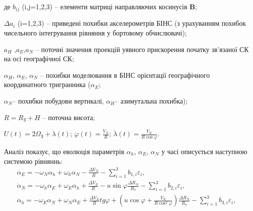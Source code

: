 \begin{ESKDexplanation}
\item де $b_{ij}$ (i,j=1,2,3) -- елементи матриці направляючих косинусів \textbf{B}; 
\item $\Delta a_{i}$ (i=1,2,3) -- приведені похибки акселерометрів БІНС (з урахуванням 
похибок чисельного інтегрування рівняння  у бортовому обчислювачі); 
\item $a_{H}$ ,$a_{E}$,$a_{N}$ -- поточні значення проекцій уявного прискорення початку зв'язаної СК на 
осі географічної СК; 
\item $\alpha_{H}$, $\alpha_{E}$, $\alpha_{N}$ -- похибки моделювання 
в БІНС орієнтації географічного координатного тригранника ($\alpha_{E} $;
\item $\alpha_{N} $-- похибки побудови вертикалі, $\alpha_{H} $-- азимутальна похибка); 
\item $R=R_{\text{З}} +H$ -- поточна висота; 
\item $U(t)=2\Omega_{\text{З}} +\dot{\lambda }(t)$; $\dot{\varphi}(t)=\frac{V_{N}}{R}$; $\dot{\lambda }(t)=\frac{V_{E}}{R\cos \varphi }.$ 
\end{ESKDexplanation}
  Аналіз показує, що еволюція параметрів $\alpha_{h}$, $\alpha_{E}$, $\alpha_{N}$ у часі описується наступною системою рівняннь:
\begin{equation} 
\label{eq:dasdins} \begin{array}{l} 
{\dot{\alpha }_{E} =-\omega_{N} \alpha_{h} +\omega_{h} \alpha_{N} -\frac{\Delta V_{N} }{R} -\sum_{i=1}^{3}b_{1,i}\varepsilon_{i} ,} \\
{\dot{\alpha }_{N} =-\omega_{h} \alpha_{E} +\omega_{E} \alpha_{h} +\frac{\Delta V_{E} }{R} -u\sin \varphi \frac{\Delta R_{N} }{R_{7} }
-\sum_{i=1}^{3}b_{2,i}  \varepsilon_{i} ,} \\ 
{\dot{\alpha }_{h} =-\omega_{E} \alpha_{N} +\omega_{N} \alpha_{E} +\frac{\Delta V_{E} }{R} tg\varphi +(u\cos \varphi +\frac{V_{E} }{R\cos ^{2} \varphi } )
\frac{\Delta R_{N} }{R_{7} } -\sum_{i=1}^{3}b_{3,i}\varepsilon_{i} ,} \end{array} \end{equation} 

